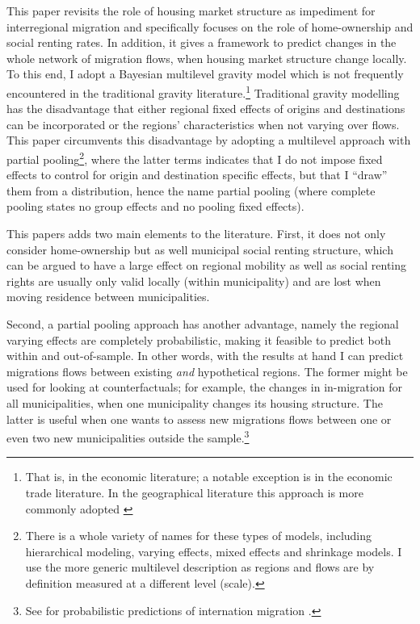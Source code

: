 \documentclass[fleqn,10pt]{SelfArx} %
\begin{document}
        This paper revisits the role of housing market structure
        as impediment for interregional migration and specifically
        focuses on the role of home-ownership and social renting
        rates. In addition, it gives a framework to predict changes 
        in the whole network of migration flows, when housing market structure change locally. 
        To this end, I adopt a Bayesian multilevel gravity model
        which is not frequently encountered in the traditional gravity 
        literature.\footnote{That is, in the economic literature; a
          notable exception is \citet{ranjan2007bayesian} in the
          economic trade literature. In the geographical literature
          this approach is more commonly adopted \citep[see within a
          migration context][]{congdon2010random,
            congdon2012spatial}} Traditional gravity modelling has
        the disadvantage that either regional fixed effects of origins
        and destinations can be incorporated or the regions'
        characteristics when not varying over flows. This paper
        circumvents this disadvantage by adopting a multilevel
        approach with partial pooling\footnote{There is a whole
          variety of names for these types of models, including
          hierarchical modeling, varying effects, mixed effects and
          shrinkage models. I use the more generic multilevel
          description as regions and flows are by definition measured
          at a different level (scale).}, where the latter terms
        indicates that I do not impose fixed effects to control for
        origin and destination specific effects, but that I ``draw''
        them from a distribution, hence the name partial pooling
        (where complete pooling states no group effects and no pooling
        fixed effects).
               
        This papers adds two main elements to the literature. First, it does not
        only consider home-ownership but as well municipal social renting
        structure, which can be argued \citep[see, e.g.,][]{boyle1998migration,
          hughes1981council} to have a large effect on regional mobility as well
        as social renting rights are usually only valid locally (within
        municipality) and are lost when moving residence between municipalities.
        
        Second, a partial pooling approach has another advantage, namely the
        regional varying effects are completely probabilistic, making it
        feasible to predict both within and out-of-sample. In other words, with
        the results at hand I can predict migrations flows between existing
        \emph{and} hypothetical regions. The former might be used for looking at
        counterfactuals; for example, the changes in in-migration for all
        municipalities, when one municipality changes its housing structure. The
        latter is useful when one wants to assess new migrations flows between
        one or even two new municipalities outside the sample.\footnote{See for
          probabilistic predictions of internation migration
          \cite{azose2015bayesian}.}
	
\end{document}
